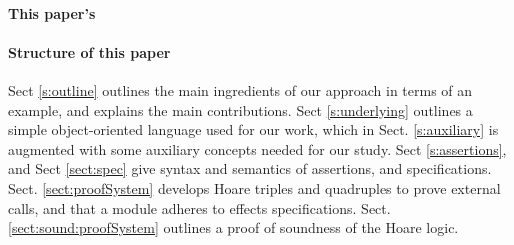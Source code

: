 
\paragraph{This paper's } %


 \paragraph{Structure of this paper}
Sect \ref{s:outline}   outlines the main ingredients of our approach in terms of an example, and explains the main contributions.
Sect \ref{s:underlying} outlines a simple object-oriented language used for our work, which in Sect. \ref{s:auxiliary} is augmented with some auxiliary concepts needed for our study.
Sect \ref{s:assertions}, and Sect \ref{sect:spec}  give syntax and semantics of  assertions, and  specifications.
Sect. \ref{sect:proofSystem} develops Hoare triples and quadruples to prove external calls, and that a module adheres to \tamed effects specifications.
Sect. \ref{sect:sound:proofSystem} outlines a proof of soundness of the Hoare logic. 
 
 
 

